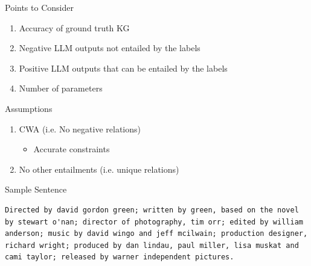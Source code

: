 \documentclass[aspectratio=169,xcolor=dvipsnames]{beamer}
\begin{document}
\begin{frame}{Points to Consider}
    \begin{enumerate}
        \item Accuracy of ground truth KG
        \item Negative LLM outputs not entailed by the labels
        \item Positive LLM outputs that can be entailed by the labels
        \item Number of parameters
    \end{enumerate}
\end{frame}

\begin{frame}{Assumptions}
    \begin{enumerate}
        \item CWA (i.e. No negative relations)
        \begin{itemize}
            \item[] Accurate constraints 
        \end{itemize}
        \item No other entailments (i.e. unique relations)
    \end{enumerate}
\end{frame}

\begin{frame}[fragile]{Sample Sentence}
\begin{verbatim}
Directed by david gordon green; written by green, based on the novel by stewart o'nan; director of photography, tim orr; edited by william anderson; music by david wingo and jeff mcilwain; production designer, richard wright; produced by dan lindau, paul miller, lisa muskat and cami taylor; released by warner independent pictures. 
\end{verbatim}    
\end{frame}
\end{document}
